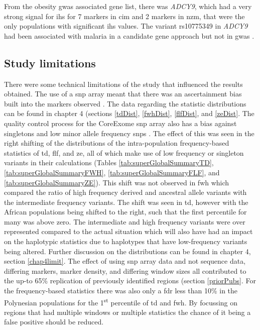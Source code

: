 \documentclass[twoside,openright]{report}
\begin{document}
From the obesity \gls{gwas} associated gene list, there was
\emph{ADCY9}, which had a very strong signal for \gls{ihs} for 7 markers
in \gls{cim} and 2 markers in \gls{nzm}, that were the only populations
with significant \gls{ihs} values. The variant rs10775349 in
\emph{ADCY9} had been associated with malaria in a candidate gene
approach but not in \gls{gwas} \citep{Maiga2013}.

\subsection{Study limitations}\label{chap3limit}

There were some technical limitations of the study that influenced the
results obtained. The use of a \gls{snp} array meant that there was an
ascertainment bias built into the markers observed
\citep{nielsen2007recent}. The data regarding the statistic
distributions can be found in chapter 4 (sections \ref{tdDist},
\ref{fwhDist}, \ref{flfDist}, and \ref{zeDist}. The quality control
process for the CoreExome \gls{snp} array also has a bias against
singletons and low minor allele frequency \glspl{snp} \citep{Guo2014}.
The effect of this was seen in the right shifting of the distributions
of the intra-population frequency-based statistics of \gls{td},
\gls{flf}, and \gls{ze}, all of which make use of low frequency or
singleton variants in their calculations (Tables
\ref{tab:superGlobalSummaryTD}, \ref{tab:superGlobalSummaryFWH},
\ref{tab:superGlobalSummaryFLF}, and \ref{tab:superGlobalSummaryZE}).
This shift was not observed in \gls{fwh} which compared the ratio of
high frequency derived and ancestral allele variants with the
intermediate frequency variants. The shift was seen in \gls{td}, however
with the African populations being shifted to the right, such that the
first percentile for many was above zero. The intermediate and high
frequency variants were over represented compared to the actual
situation which will also have had an impact on the haplotypic
statistics due to haplotypes that have low-frequency variants being
altered. Further discussion on the distributions can be found in chapter
4, section \ref{chap4limit}. The effect of using \gls{snp} array data
and not sequence data, differing markers, marker density, and differing
window sizes all contributed to the up-to 65\% replication of previously
identified regions (section \ref{priorPubs}. For the frequency-based
statistics there was also only a \gls{fdr} less than 10\% in the
Polynesian populations for the 1\textsuperscript{st} percentile of
\gls{td} and \gls{fwh}. By focussing on regions that had multiple
windows or multiple statistics the chance of it being a false positive
should be reduced.
\end{document}
